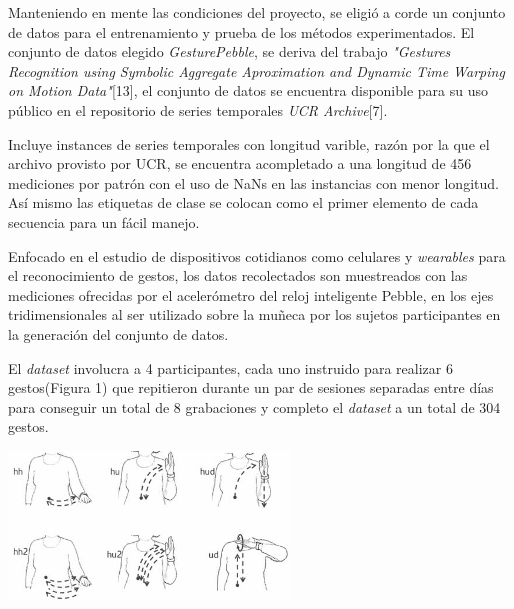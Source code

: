 
\hfill\break
\justifying
Manteniendo en mente las condiciones del proyecto, se eligió a corde un conjunto de datos para el entrenamiento y prueba de los métodos experimentados. El conjunto de datos elegido \textit{GesturePebble}, se deriva del trabajo \textit{"Gestures Recognition using Symbolic Aggregate Aproximation and Dynamic Time Warping on Motion Data"}[13], el conjunto de datos se encuentra disponible para su uso público en el repositorio de series temporales \textit{UCR Archive}[7].

\hfill\break
\justifying
Incluye instances de series temporales con longitud varible, razón por la que el archivo provisto por UCR, se encuentra acompletado a una longitud de 456 mediciones por patrón con el uso de NaNs en las instancias con menor longitud. Así mismo las etiquetas de clase se colocan como el primer elemento de cada secuencia para un fácil manejo.

\hfill\break
\justifying
Enfocado en el estudio de dispositivos cotidianos como celulares y \textit{wearables} para el reconocimiento de gestos, los datos recolectados son muestreados con las mediciones ofrecidas por el acelerómetro del reloj inteligente Pebble, en los ejes tridimensionales al ser utilizado sobre la muñeca por los sujetos participantes en la generación del conjunto de datos.

\hfill\break
\justifying
El \textit{dataset} involucra a 4 participantes, cada uno instruido para realizar 6 gestos(Figura 1) que repitieron durante un par de sesiones separadas entre días para conseguir un total de 8 grabaciones y completo el \textit{dataset} a un total de 304 gestos. 

\hfill\break
\begin{minipage}{\linewidth}
	\centering
	\includegraphics[width=7.5cm]{Imagenes/gestos_motrices.png}
	\label{gestos_motrices}
\end{minipage}


